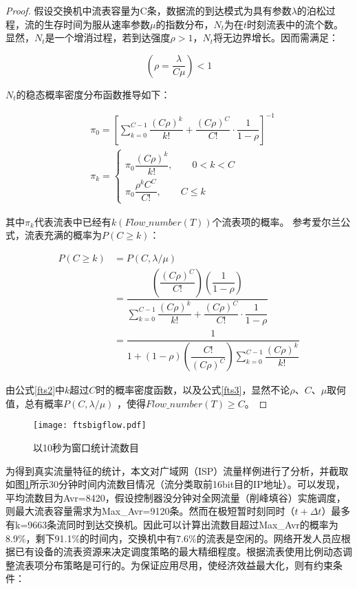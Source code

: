 \begin{proof}
	假设交换机中流表容量为C条，数据流的到达模式为具有参数$\lambda$的泊松过程，流的生存时间为服从速率参数$\mu$的指数分布，$N_t$为在$t$时刻流表中的流个数。显然，$N_t$是一个增消过程，若到达强度$\rho>1$，$N_t$将无边界增长。因而需满足：
	
	\begin{equation}
	(\rho=\dfrac{\lambda}{C\mu})<1
	\end{equation}
	
	$N_t$的稳态概率密度分布函数推导如下：
	
	
	
	\begin{align}\label{fts1}
	&\pi_0 = [\sum_{k=0}^{C-1}\dfrac{(C\rho)^k}{k!}+\dfrac{(C\rho)^C}{C!}\cdot\dfrac{1}{1-\rho}]^{-1}  \\
	&\pi_k = \begin{cases}\label{fts2}
	\pi_0\dfrac{(C\rho)^k}{k!}, \qquad 0<k<C \\
	\pi_0\dfrac{\rho^kC^C}{C!}, \qquad C \leq k
	\end{cases}
	\end{align}
	
	其中$\pi_k$代表流表中已经有$k(Flow\_number(T))$个流表项的概率。
	参考爱尔兰公式，流表充满的概率为$ P(C\geq  k) $：
	
	\begin{align}\label{fts3}
	P(C\geq  k) &= P(C,\lambda/\mu) \nonumber \\
	&=\dfrac {\left( \dfrac {\left( C\rho\right)^C}{C!}\right) \left( \dfrac {1}{1-\rho }\right) }{\sum ^{C-1}_{k=0}\dfrac {\left( C\rho\right) ^{k}}{k!}+\dfrac {\left( C\rho\right) ^{C}}{C!}\cdot\dfrac {1}{1-\rho }} \nonumber  \\
	&=\dfrac {1}{1+\left( 1-\rho \right) \left( \dfrac {C!}{(C\rho)^{C}}\right) \sum ^{C-1}_{k=0}\dfrac {(C\rho)^{k}}{k!}}
	\end{align}	
	
	由公式\ref{fts2}中$ k $超过$ C $时的概率密度函数，以及公式\ref{fts3}，显然不论$ \rho $、$ C $、$\mu$取何值，总有概率$ P(C,\lambda/\mu) $ ，使得$ Flow\_number(T) \geq C $。
\end{proof}

\begin{figure}[!ht]
	\centering 
	\texttt{[image: ftsbigflow.pdf]}
	\caption{以10秒为窗口统计流数目} \label{fig:ftsbigflow}
\end{figure}

为得到真实流量特征的统计，本文对广域网（ISP）流量样例进行了分析，并截取如图\ref{fig:ftsbigflow}所示30分钟时间内流数目情况（流分类取前16bit目的IP地址）。可以发现，平均流数目为Avr=8420，假设控制器没分钟对全网流量（削峰填谷）实施调度，则最大流表容量需求为Max\_Avr=9120条。然而在极短暂时刻同时（$t+\Delta t$）最多有k=9663条流同时到达交换机。因此可以计算出流数目超过Max\_Avr的概率为8.9\%，剩下91.1\%的时间内，交换机中有7.6\%的流表是空闲的。网络开发人员应根据已有设备的流表资源来决定调度策略的最大精细程度。根据流表使用比例动态调整流表项分布策略是可行的。为保证应用尽用，使经济效益最大化，则有约束条件：

